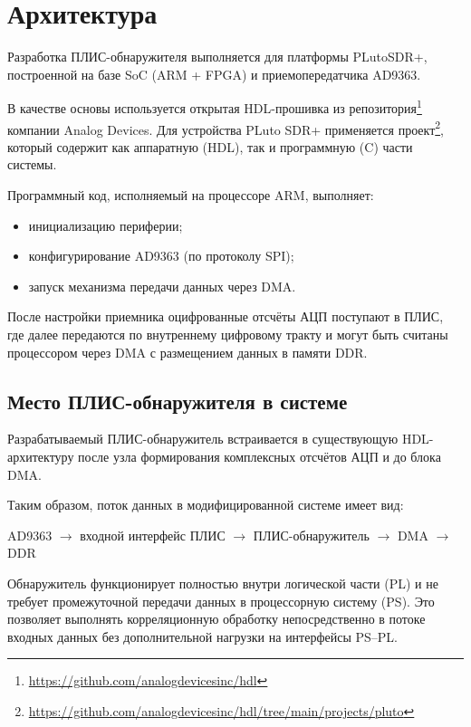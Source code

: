 \section{Архитектура}

Разработка ПЛИС-обнаружителя выполняется для платформы PLutoSDR+, построенной на базе SoC (ARM + FPGA) и приемопередатчика AD9363.  

В качестве основы используется открытая HDL-прошивка из репозитория\footnote{\url{https://github.com/analogdevicesinc/hdl}} компании Analog Devices.  
Для устройства PLuto SDR+ применяется проект\footnote{\url{https://github.com/analogdevicesinc/hdl/tree/main/projects/pluto}},  
который содержит как аппаратную (HDL), так и программную (C) части системы.

Программный код, исполняемый на процессоре ARM, выполняет:
\begin{itemize}
	\item инициализацию периферии;
	\item конфигурирование AD9363 (по протоколу SPI);
	\item запуск механизма передачи данных через DMA.
\end{itemize}

После настройки приемника оцифрованные отсчёты АЦП поступают в ПЛИС, где далее передаются по внутреннему цифровому тракту и могут быть считаны процессором через DMA с размещением данных в памяти DDR.

\subsection{Место ПЛИС-обнаружителя в системе}

Разрабатываемый ПЛИС-обнаружитель встраивается в существующую HDL-архитектуру после узла формирования комплексных отсчётов АЦП и до блока DMA.  

Таким образом, поток данных в модифицированной системе имеет вид:

\begin{center}
	AD9363 $\rightarrow$ входной интерфейс ПЛИС $\rightarrow$ ПЛИС-обнаружитель $\rightarrow$ DMA $\rightarrow$ DDR
\end{center}

Обнаружитель функционирует полностью внутри логической части (PL) и не требует промежуточной передачи данных в процессорную систему (PS). Это позволяет выполнять корреляционную обработку непосредственно в потоке входных данных без дополнительной нагрузки на интерфейсы PS--PL.

